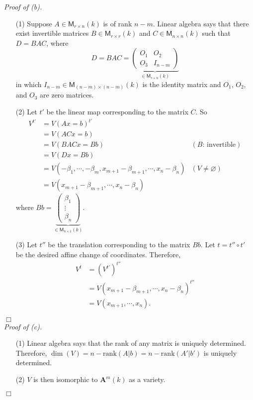 \documentclass{article}
\begin{document}
\emph{Proof of (b).}
\begin{enumerate}
\item[(1)]
  Suppose $A \in \mathsf{M}_{r \times n}(k)$ is of rank $n - m$.
  Linear algebra says that there exist invertible matrices
  $B \in \mathsf{M}_{r \times r}(k)$ and $C \in \mathsf{M}_{n \times n}(k)$
  such that $D = BAC$, where
  \[
    D = BAC =
    \underbrace{\begin{pmatrix}
    O_1 & O_2 \\
    O_3 & I_{n-m}
    \end{pmatrix}}_{\in \mathsf{M}_{r \times n}(k)}
  \]
  in which $I_{n-m} \in \mathsf{M}_{(n-m) \times (n-m)}(k)$ is the identity matrix
  and $O_1$, $O_2$, and $O_3$ are zero matrices.

\item[(2)]
  Let $t'$ be the linear map corresponding to the matrix $C$.
  So
  \begin{align*}
    V^{t'}
    &= V(Ax = b)^{t'} \\
    &= V(ACx = b) \\
    &= V(BACx = Bb)
      &(\text{$B$: invertible}) \\
    &= V(Dx = Bb) \\
    &= V(-\beta_1, \cdots, -\beta_m, x_{m+1} - \beta_{m+1}, \cdots, x_n - \beta_n)
      &(V \neq \varnothing) \\
    &= V(x_{m+1} - \beta_{m+1}, \cdots, x_n - \beta_n)
  \end{align*}
  where $Bb =
  \underbrace{\begin{pmatrix}
    \beta_1 \\
    \vdots \\
    \beta_n
  \end{pmatrix}}_{\in \mathsf{M}_{n \times 1}(k)}$.

\item[(3)]
  Let $t''$ be the translation corresponding to the matrix $Bb$.
  Let $t = t'' \circ t'$ be the desired affine change of coordinates.
  Therefore,
  \begin{align*}
    V^{t}
    &= (V^{t'})^{t''} \\
    &= V(x_{m+1} - \beta_{m+1}, \cdots, x_n - \beta_n)^{t''} \\
    &= V(x_{m+1}, \cdots, x_n).
  \end{align*}
\end{enumerate}
$\Box$ \\



\emph{Proof of (c).}
\begin{enumerate}
\item[(1)]
  Linear algebra says that
  the rank of any matrix is uniquely determined.
  Therefore, $\dim(V) = n - \mathrm{rank}(A|b) = n - \mathrm{rank}(A'|b')$ is uniquely determined.

\item[(2)]
  $V$ is then isomorphic to $\mathbf{A}^m(k)$ as a variety.
\end{enumerate}
$\Box$ \\\\
\end{document}
